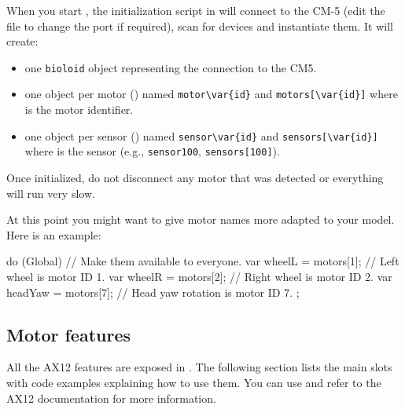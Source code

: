 When you start \urbi, the initialization script in  will
connect to the CM-5 (edit the file to change the port if required), scan for
devices and instantiate them. It will create:

\begin{itemize}
\item one \lstinline|bioloid| object representing the connection to the CM5.
\item one object per motor () named
  \lstinline|motor\var{id}| and \lstinline|motors[\var{id}]| where 
  is the motor identifier.
\item one object per sensor () named
  \lstinline|sensor\var{id}| and \lstinline|sensors[\var{id}]| where
   is the sensor  (e.g., \lstinline|sensor100|,
  \lstinline|sensors[100]|).
\end{itemize}

Once initialized, do not disconnect any motor that was detected or
everything will run very slow.

At this point you might want to give motor names more adapted to your model.
Here is an example:

\begin{urbiunchecked}
do (Global) // Make them available to everyone.
{
  var wheelL = motors[1];  // Left wheel is motor ID 1.
  var wheelR = motors[2];  // Right wheel is motor ID 2.
  var headYaw = motors[7]; // Head yaw rotation is motor ID 7.
};
\end{urbiunchecked}


\subsection{Motor features}

All the AX12 features are exposed in \us. The following section lists
the main slots with code examples explaining how to use them. You can use
 and refer to the AX12 documentation for
more information.

